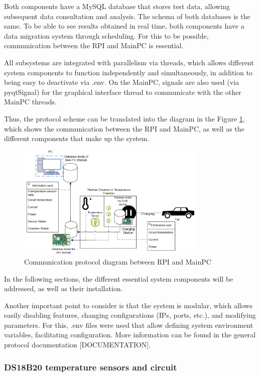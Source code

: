 Both components have a MySQL database that stores test data, allowing subsequent data consultation and analysis. The schema of both databases is the same. To be able to see results obtained in real time, both components have a data migration system through scheduling. For this to be possible, communication between the RPI and MainPC is essential.

All subsystems are integrated with parallelism via threads, which allows different system components to function independently and simultaneously, in addition to being easy to deactivate via .env. On the MainPC, signals are also used (via pyqtSignal) for the graphical interface thread to communicate with the other MainPC threads. 

Thus, the protocol scheme can be translated into the diagram in the Figure \ref{fig:diagrama_protocolo}, which shows the communication between the RPI and MainPC, as well as the different components that make up the system.
\begin{figure}[H]
    \centering
    \includegraphics[width=0.8\textwidth]{figures/protocol_diagram.png}
    \caption{Communication protocol diagram between RPI and MainPC}
    \label{fig:diagrama_protocolo}
\end{figure}

In the following sections, the different essential system components will be addressed, as well as their installation.

Another important point to consider is that the system is modular, which allows easily disabling features, changing configurations (IPs, ports, etc.), and modifying parameters. For this, .env files were used that allow defining system environment variables, facilitating configuration. More information can be found in the general protocol documentation [DOCUMENTATION].

\subsubsection{DS18B20 temperature sensors and circuit}

